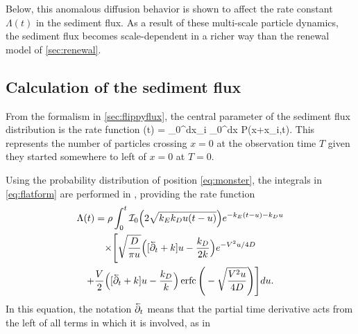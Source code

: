 Below, this anomalous diffusion behavior \DIFdelbegin {}\DIFdelend \DIFaddbegin {}\DIFaddend is shown to affect the rate constant $\Lambda(t)$ in the sediment flux. As a result of these multi-scale particle dynamics, the sediment flux becomes scale-dependent in a richer way than the renewal model of \DIFdelbegin {}\DIFdelend \DIFaddbegin {}\DIFaddend \ref{sec:renewal}.

\subsection{Calculation of the sediment flux}

From the formalism in \DIFdelbegin {}\DIFdelend \DIFaddbegin {}\DIFaddend \ref{sec:flippyflux}, the central parameter of the sediment flux distribution is the rate function
\be \Lambda(t) = \rho \int_0^\infty dx_i \int_0^\infty dx P(x+x_i,t). \label{eq:flatform}\ee
This represents the number of particles crossing $x=0$ at the observation time $T$ given they started somewhere to left of $x=0$ at $T=0$.

Using the probability distribution of position \DIFaddbegin {}\DIFaddend \ref{eq:monster}, the integrals in \DIFdelbegin {}\DIFdelend \DIFaddbegin {}\DIFaddend \ref{eq:flatform} are performed in \DIFdelbegin {}\DIFdelend \DIFaddbegin {}\DIFaddend , providing the rate function
\begin{multline} 
\Lambda(t) = \rho \int_0^t \mathcal{I}_0\Big(2\sqrt{k_Ek_Du(t-u)}\Big)e^{-k_E(t-u)-k_D u} \\
\times \Bigg[\sqrt{\frac{D}{\pi u}}\Big([\cev{\partial_t} + k]u-\frac{k_D}{2 k}\Big)e^{-V^2 u/4D} \\+ \frac{V}{2}\Big([\cev{\partial_t} + k]u -\frac{k_D}{k}\Big) \erfc\Bigg(-\sqrt{\frac{V^2 u}{4D}}\Bigg)\Bigg] du. \label{eq:fluxy}
\end{multline}
In this equation, the notation $\cev{\partial_t}$ means that the partial time derivative acts from the left of all terms in which it is involved, as in \DIFdelbegin {}\DIFdelend \DIFaddbegin {}\DIFaddend 

